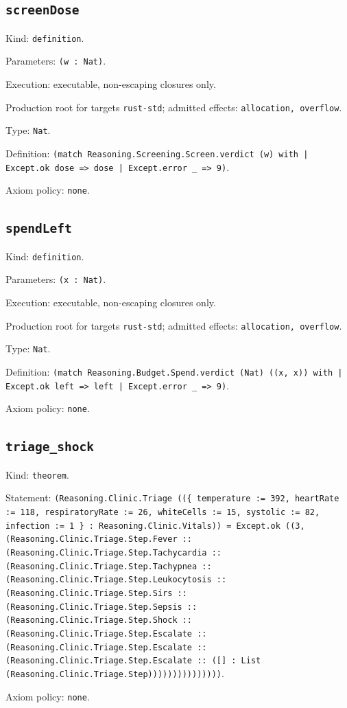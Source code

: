 \documentclass[11pt]{article}
\begin{document}
\subsection*{\texttt{screenDose}}
\noindent Kind: \texttt{definition}.\par
\noindent Parameters: \texttt{(w : Nat)}.\par
\noindent Execution: executable, non-escaping closures only.\par
\noindent Production root for targets \texttt{rust-std}; admitted effects: \texttt{allocation, overflow}.\par
\noindent Type: \texttt{Nat}.\par
\noindent Definition: \texttt{(match Reasoning.Screening.Screen.verdict (w) with | Except.ok dose => dose | Except.error \_ => 9)}.\par
\noindent Axiom policy: \texttt{none}.\par
\subsection*{\texttt{spendLeft}}
\noindent Kind: \texttt{definition}.\par
\noindent Parameters: \texttt{(x : Nat)}.\par
\noindent Execution: executable, non-escaping closures only.\par
\noindent Production root for targets \texttt{rust-std}; admitted effects: \texttt{allocation, overflow}.\par
\noindent Type: \texttt{Nat}.\par
\noindent Definition: \texttt{(match Reasoning.Budget.Spend.verdict (Nat) ((x, x)) with | Except.ok left => left | Except.error \_ => 9)}.\par
\noindent Axiom policy: \texttt{none}.\par
\subsection*{\texttt{triage\_shock}}
\noindent Kind: \texttt{theorem}.\par
\noindent Statement: \texttt{(Reasoning.Clinic.Triage ((\{ temperature := 392, heartRate := 118, respiratoryRate := 26, whiteCells := 15, systolic := 82, infection := 1 \} : Reasoning.Clinic.Vitals)) = Except.ok ((3, (Reasoning.Clinic.Triage.Step.Fever :: (Reasoning.Clinic.Triage.Step.Tachycardia :: (Reasoning.Clinic.Triage.Step.Tachypnea :: (Reasoning.Clinic.Triage.Step.Leukocytosis :: (Reasoning.Clinic.Triage.Step.Sirs :: (Reasoning.Clinic.Triage.Step.Sepsis :: (Reasoning.Clinic.Triage.Step.Shock :: (Reasoning.Clinic.Triage.Step.Escalate :: (Reasoning.Clinic.Triage.Step.Escalate :: (Reasoning.Clinic.Triage.Step.Escalate :: ([] : List (Reasoning.Clinic.Triage.Step)))))))))))))))}.\par
\noindent Axiom policy: \texttt{none}.\par
\end{document}
